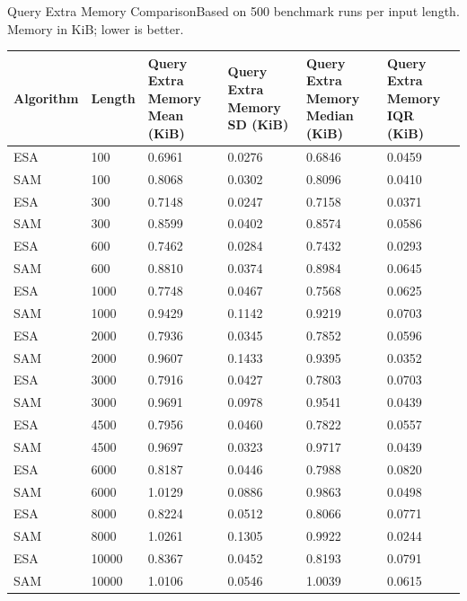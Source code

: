 \begin{benchmarktable}{Query Extra Memory Comparison}{Based on 500 benchmark runs per input length. Memory in KiB; lower is better.}
\begin{tabularx}{\textwidth}{|X|X|X|X|X|X|}
\toprule
Algorithm & Length & Query Extra Memory Mean (KiB) & Query Extra Memory SD (KiB) & Query Extra Memory Median (KiB) & Query Extra Memory IQR (KiB) \\
\midrule
ESA & 100 & 0.6961 & 0.0276 & 0.6846 & 0.0459 \\
SAM & 100 & 0.8068 & 0.0302 & 0.8096 & 0.0410 \\
\hline
ESA & 300 & 0.7148 & 0.0247 & 0.7158 & 0.0371 \\
SAM & 300 & 0.8599 & 0.0402 & 0.8574 & 0.0586 \\
\hline
ESA & 600 & 0.7462 & 0.0284 & 0.7432 & 0.0293 \\
SAM & 600 & 0.8810 & 0.0374 & 0.8984 & 0.0645 \\
\hline
ESA & 1000 & 0.7748 & 0.0467 & 0.7568 & 0.0625 \\
SAM & 1000 & 0.9429 & 0.1142 & 0.9219 & 0.0703 \\
\hline
ESA & 2000 & 0.7936 & 0.0345 & 0.7852 & 0.0596 \\
SAM & 2000 & 0.9607 & 0.1433 & 0.9395 & 0.0352 \\
\hline
ESA & 3000 & 0.7916 & 0.0427 & 0.7803 & 0.0703 \\
SAM & 3000 & 0.9691 & 0.0978 & 0.9541 & 0.0439 \\
\hline
ESA & 4500 & 0.7956 & 0.0460 & 0.7822 & 0.0557 \\
SAM & 4500 & 0.9697 & 0.0323 & 0.9717 & 0.0439 \\
\hline
ESA & 6000 & 0.8187 & 0.0446 & 0.7988 & 0.0820 \\
SAM & 6000 & 1.0129 & 0.0886 & 0.9863 & 0.0498 \\
\hline
ESA & 8000 & 0.8224 & 0.0512 & 0.8066 & 0.0771 \\
SAM & 8000 & 1.0261 & 0.1305 & 0.9922 & 0.0244 \\
\hline
ESA & 10000 & 0.8367 & 0.0452 & 0.8193 & 0.0791 \\
SAM & 10000 & 1.0106 & 0.0546 & 1.0039 & 0.0615 \\
\bottomrule
\end{tabularx}
\end{benchmarktable}

